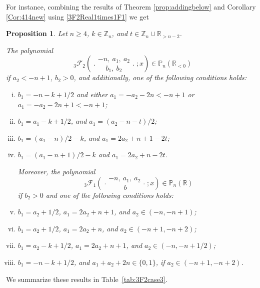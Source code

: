 \documentclass[reqno,11pt]{amsart}
\newtheorem{proposition}[theorem]{Proposition}
\theoremstyle{remark}
\renewcommand{\P}{\mathbb{P}}
\newcommand{\R}{\mathbb{R}}
\newcommand{\Z}{\mathbb{Z}}
\newcommand{\rr}{\mathbb{R}}
\newcommand*\pFq[5]{%
 {\ }_{#1}{\mathcal F}_{#2}{\left(\genfrac..{0pt}{}{#3}{#4};#5\right)}%
}
\begin{document}
For instance, combining the results of Theorem \ref{prop:addingbelow} and Corollary \ref{Cor:414new} using \eqref{3F2Real1times1F1} we get
\begin{proposition}
\label{prop3F2Case3Newversion}
Let $n\ge 4$, $k \in \Z_n$, and $t\in \Z_n \cup\rr_{>n-2}$.

The polynomial
\begin{equation*}
    \pFq{3}{2}{-n,\ a_1,\ a_2}{ b_1, \ b_2}{x} \in \P_n(\R_{<0})
\end{equation*} 
if $a_2<-n+1$, $b_2>0$, and additionally, one of the following conditions holds:
\begin{enumerate}[(i)]
  \item  
   $ b_1=-n -k +1/2$ and
   either $a_1=-a_2-2n<-n+1$ or $a_1=-a_2-2n+1<-n+1$;

 \item  
    $ b_1= a_1 - k +1/2$, and 
    $a_1= (a_2-n-t)/2$;

 \item  
   $ b_1= (a_1-n)/2-k  $, and $a_1=2a_2+n+1-2t$;

\item  
   $ b_1= (a_1-n+1)/2-k$ and $a_1=2a_2+n -2t $.

\vspace{.2cm}

\hspace{-1.3cm} Moreover, the polynomial 
\begin{equation*}
    \pFq{3}{1}{-n,\ a_1,\ a_2}{\ b}{x} \in \P_n(\R )
\end{equation*}
if $b_2>0$ and one of the following conditions holds:

\vspace{.2cm}

    \item  
    $ b_1= a_2+1/2 $,    $a_1 = 2a_2+n +1$, and $a_2\in (-n ,-n+1) $;

   \item  
   $ b_1= a_2+1/2 $, $a_1 = 2a_2+n $, and $a_2\in (-n+1,-n+2) $;
   
  \item  
    $ b_1= a_2 - k +1/2$,  $a_1 = 2a_2+n  +1$, and $a_2\in (-n,-n+1/2)$;

 \item  
   $ b_1=-n -k +1/2$, and $a_1+a_2+2n\in \{0, 1\}$, if   $a_2\in (-n+1,-n+2)$.
\end{enumerate} 
\end{proposition} 

We summarize these results in Table~\ref{tab:3F2case3}. 
\end{document}
